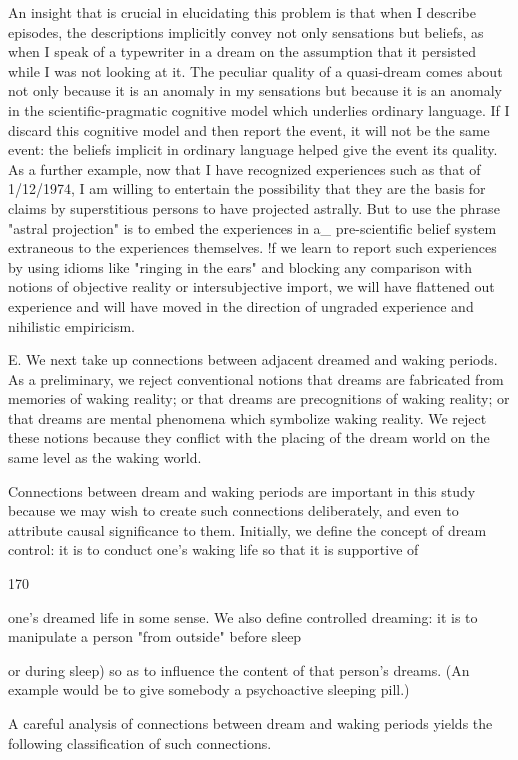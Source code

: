 \documentclass[10pt,twoside]{memoir}
\begin{document}
\begin{enumerate}
{\begin{enumerate}
\begin{sysrules}
\begin{sysrules}
\begin{sysrules}
\begin{sysrules}
{\begin{enumerate}
{{{{{{An insight that is crucial in elucidating this problem is that when I 
describe episodes, the descriptions implicitly convey not only sensations but 
beliefs, as when I speak of a typewriter in a dream on the assumption that it 
persisted while I was not looking at it. The peculiar quality of a quasi-dream 
comes about not only because it is an anomaly in my sensations but because 
it is an anomaly in the scientific-pragmatic cognitive model which underlies 
ordinary language. If I discard this cognitive model and then report the 
event, it will not be the same event: the beliefs implicit in ordinary language 
helped give the event its quality. As a further example, now that I have 
recognized experiences such as that of 1/12/1974, I am willing to entertain 
the possibility that they are the basis for claims by superstitious persons to 
have projected astrally. But to use the phrase "astral projection" is to embed 
the experiences in a_ pre-scientific belief system extraneous to the 
experiences themselves. !f we learn to report such experiences by using 
idioms like "ringing in the ears" and blocking any comparison with notions 
of objective reality or intersubjective import, we will have flattened out 
experience and will have moved in the direction of ungraded experience and 
nihilistic empiricism. 

E. We next take up connections between adjacent dreamed and waking 
periods. As a preliminary, we reject conventional notions that dreams are 
fabricated from memories of waking reality; or that dreams are precognitions 
of waking reality; or that dreams are mental phenomena which symbolize 
waking reality. We reject these notions because they conflict with the placing 
of the dream world on the same level as the waking world. 

Connections between dream and waking periods are important in this 
study because we may wish to create such connections deliberately, and even 
to attribute causal significance to them. Initially, we define the concept of 
dream control: it is to conduct one's waking life so that it is supportive of 


170 


one's dreamed life in some sense. We also define controlled dreaming: it is to 
manipulate a person "from outside" before sleep {or during sleep) so as to 
influence the content of that person's dreams. (An example would be to give 
somebody a psychoactive sleeping pill.) 

A careful analysis of connections between dream and waking periods 
yields the following classification of such connections. 

}}}}}}}
\end{enumerate}}
\end{sysrules}
\end{sysrules}
\end{sysrules}
\end{sysrules}
\end{enumerate}}
\end{enumerate}
\end{document}
